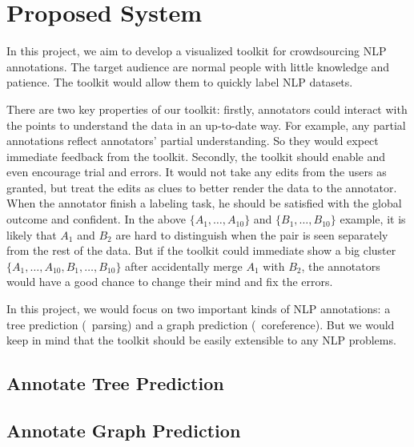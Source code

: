 \section{Proposed System}

In this project, we aim to develop a visualized toolkit for crowdsourcing NLP annotations. The target audience are normal people with little knowledge and patience. The toolkit would allow them to quickly label NLP datasets.

There are two key properties of our toolkit: firstly, annotators could interact with the points to understand the data in an up-to-date way. For example, any partial annotations reflect annotators' partial understanding. So they would expect immediate feedback from the toolkit. Secondly, the toolkit should enable and even encourage trial and errors. It would not take any edits from the users as granted, but treat the edits as clues to better render the data to the annotator. When the annotator finish a labeling task, he should be satisfied with the global outcome and confident. In the above $\{A_1,\ldots,A_{10}\}$ and $\{B_1,\ldots,B_{10}\}$ example, it is likely that $A_1$ and $B_2$ are hard to distinguish when the pair is seen separately from the rest of the data. But if the toolkit could immediate show a big cluster $\{A_1,\ldots,A_{10}, B_1,\ldots,B_{10}\}$ after accidentally merge $A_1$ with $B_2$, the annotators would have a good chance to change their mind and fix the errors. 

 In this project, we would focus on two important kinds of NLP annotations: a tree prediction (\eg\  parsing) and a graph prediction (\eg\ coreference). But we would keep in mind that the toolkit should be easily extensible to any NLP problems. 

\subsection{Annotate Tree Prediction}
\subsection{Annotate Graph Prediction}